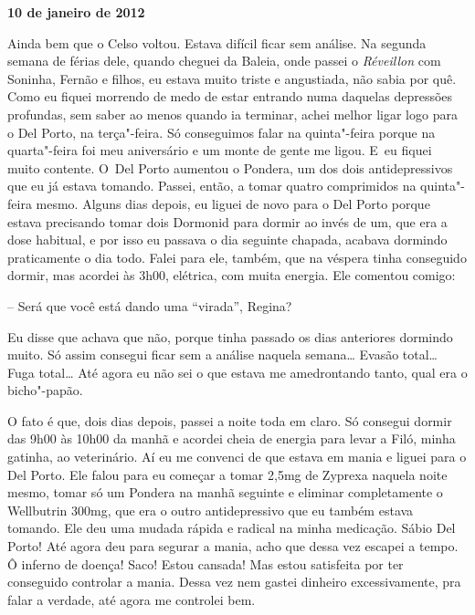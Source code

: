 \begin{center}\asterisc{}\end{center}

\begin{flushright}\textbf{10 de janeiro de 2012}\end{flushright}


Ainda bem que o Celso voltou. Estava difícil ficar sem análise. Na
segunda semana de férias dele, quando cheguei da Baleia, onde passei o
\emph{Réveillon} com Soninha, Fernão e filhos, eu estava muito triste e
angustiada, não sabia por quê. Como eu fiquei morrendo de medo de estar
entrando numa daquelas depressões profundas, sem saber ao menos quando
ia terminar, achei melhor ligar logo para o Del Porto, na terça"-feira.
Só conseguimos falar na quinta"-feira porque na quarta"-feira foi meu
aniversário e um monte de gente me ligou. E~eu fiquei muito contente. 
O~Del Porto aumentou o Pondera, um dos dois antidepressivos que eu já
estava tomando. Passei, então, a tomar quatro comprimidos na
quinta"-feira mesmo. Alguns dias depois, eu liguei de novo para o Del
Porto porque estava precisando tomar dois Dormonid para dormir ao invés
de um, que era a dose habitual, e por isso eu passava o dia seguinte
chapada, acabava dormindo praticamente o dia todo. Falei para ele,
também, que na véspera tinha conseguido dormir, mas acordei às 3h00,
elétrica, com muita energia. Ele comentou comigo:

-- Será que você está dando uma ``virada'', Regina?

Eu disse que achava que não, porque tinha passado os dias anteriores
dormindo muito. Só assim consegui ficar sem a análise naquela
semana… Evasão total… Fuga total… Até agora eu não
sei o que estava me amedrontando tanto, qual era o bicho"-papão.

O fato é que, dois dias depois, passei a noite toda em claro. Só
consegui dormir das 9h00 às 10h00 da manhã e acordei cheia de energia
para levar a Filó, minha gatinha, ao veterinário. Aí eu me convenci de
que estava em mania e liguei para o Del Porto. Ele falou para eu começar
a tomar 2,5mg de Zyprexa naquela noite mesmo, tomar só um Pondera na
manhã seguinte e eliminar completamente o Wellbutrin 300mg, que era o
outro antidepressivo que eu também estava tomando. Ele deu uma mudada
rápida e radical na minha medicação. Sábio Del Porto! Até agora deu para
segurar a mania, acho que dessa vez escapei a tempo. Ô inferno de
doença! Saco! Estou cansada! Mas estou satisfeita por ter
conseguido controlar a mania. Dessa vez nem gastei dinheiro
excessivamente, pra falar a verdade, até agora me controlei bem.

